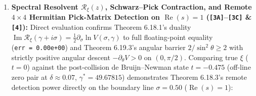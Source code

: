 \documentclass[
  11pt,
]{article}
\begin{document}
\begin{enumerate}
{  }
\item
  \textbf{Spectral Resolvent \(\mathcal{R}_\xi(z)\), Schwarz--Pick
  Contraction, and Remote \(4 \times 4\) Hermitian Pick-Matrix Detection
  on \(\operatorname{Re}(s) = 1\) (\texttt{{[}3A{]}}--\texttt{{[}3C{]}}
  \& \texttt{{[}4{]}}):} Direct evaluation confirms Theorem 6.18.1's
  duality
  \(\operatorname{Im}\mathcal{R}_\xi(\gamma + i\sigma) = \frac{1}{2}\partial_\sigma\ln V(\sigma, \gamma)\)
  to full floating-point equality (\texttt{err\ =\ 0.00e+00}) and
  Theorem 6.19.3's angular barrier \(2/\sin^2\theta \ge 2\) with
  strictly positive angular descent \(-\partial_\theta V > 0\) on
  \((0, \pi/2)\). Comparing true \(\xi\) (\(t = 0\)) against the
  post-collision de Bruijn--Newman state \(t = -0.475\) (off-line zero
  pair at \(\delta \approx 0.07\), \(\gamma^* = 49.67815\)) demonstrates
  Theorem 6.18.3's remote detection power directly on the boundary line
  \(\sigma = 0.50\) (\(\operatorname{Re}(s) = 1\)):


\end{enumerate}
\end{document}
